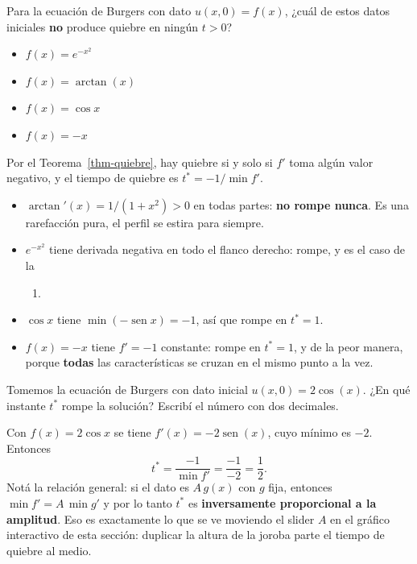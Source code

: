 \documentclass[
  spanish,
  a4paper,
]{scrbook}
\providecommand{\tightlist}{%
  \setlength{\itemsep}{0pt}\setlength{\parskip}{0pt}}
\theoremstyle{definition}
\theoremstyle{plain}
\theoremstyle{definition}
\theoremstyle{plain}
\theoremstyle{definition}
\theoremstyle{remark}
\begin{document}
Para la ecuación de Burgers con dato \(u(x,0) = f(x)\), ¿cuál de estos
datos iniciales \textbf{no} produce quiebre en ningún \(t>0\)?

\begin{itemize}
\tightlist
\item
  {\(f(x) = e^{-x^2}\)}
\item
  {\(f(x) = \arctan(x)\)}
\item
  {\(f(x) = \cos x\)}
\item
  {\(f(x) = -x\)}
\end{itemize}

Por el Teorema~\ref{thm-quiebre}, hay quiebre si y solo si \(f'\) toma
algún valor negativo, y el tiempo de quiebre es \(t^* = -1/\min f'\).

\begin{itemize}
\tightlist
\item
  \(\arctan'(x) = 1/(1+x^2) > 0\) en todas partes: \textbf{no rompe
  nunca}. Es una rarefacción pura, el perfil se estira para siempre.
\item
  \(e^{-x^2}\) tiene derivada negativa en todo el flanco derecho: rompe,
  y es el caso de la

  \begin{enumerate}
  \def\labelenumi{\arabic{enumi}.}
  \setcounter{enumi}{1}
  \tightlist
  \item
  \end{enumerate}
\item
  \(\cos x\) tiene \(\min(-\operatorname{sen} x) = -1\), así que rompe
  en \(t^*=1\).
\item
  \(f(x) = -x\) tiene \(f' = -1\) constante: rompe en \(t^*=1\), y de la
  peor manera, porque \textbf{todas} las características se cruzan en el
  mismo punto a la vez.
\end{itemize}

Tomemos la ecuación de Burgers con dato inicial \(u(x,0) = 2\cos(x)\).
¿En qué instante \(t^{*}\) rompe la solución? Escribí el número con dos
decimales.

Con \(f(x) = 2\cos x\) se tiene \(f'(x) = -2\operatorname{sen}(x)\),
cuyo mínimo es \(-2\). Entonces
\[t^* = \frac{-1}{\min f'} = \frac{-1}{-2} = \frac{1}{2}.\] Notá la
relación general: si el dato es \(A\,g(x)\) con \(g\) fija, entonces
\(\min f' = A\,\min g'\) y por lo tanto \(t^*\) es \textbf{inversamente
proporcional a la amplitud}. Eso es exactamente lo que se ve moviendo el
slider \(A\) en el gráfico interactivo de esta sección: duplicar la
altura de la joroba parte el tiempo de quiebre al medio.
\end{document}
